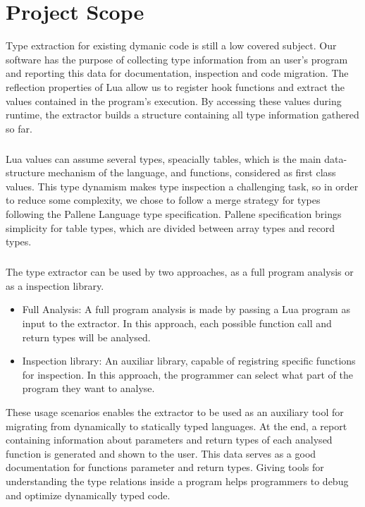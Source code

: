
\chapter{Project Scope}
\label{cha:Project Scope}
Type extraction for existing dymanic code is still a low covered subject. Our software has the purpose of collecting type information from an user's program and reporting this data for documentation, inspection and code migration. The reflection properties of Lua allow us to register hook functions and extract the values contained in the program's execution. By accessing these values during runtime, the extractor builds a structure containing all type information gathered so far.
\paragraph*{}
Lua values can assume several types, speacially tables, which is the main data-structure mechanism of the language, and functions, considered as first class values. This type dynamism makes type inspection a challenging task, so in order to reduce some complexity, we chose to follow a merge strategy for types following the Pallene Language type specification. Pallene specification brings simplicity for table types, which are divided between array types and record types.
\paragraph*{}
The type extractor can be used by two approaches, as a full program analysis or as a inspection library.
\begin{itemize}
    \item{Full Analysis:} A full program analysis is made by passing a Lua program as input to the extractor. In this approach, each possible function call and return types will be analysed.
    \item{Inspection library:} An auxiliar library, capable of registring specific functions for inspection. In this approach, the programmer can select what part of the program they want to analyse.
\end{itemize}
 These usage scenarios enables the extractor to be used as an auxiliary tool for migrating from dynamically to statically typed languages. At the end, a report containing information about parameters and return types of each analysed function is generated and shown to the user. This data serves as a good documentation for functions parameter and return types. Giving tools for understanding the type relations inside a program helps programmers to debug and optimize dynamically typed code.



